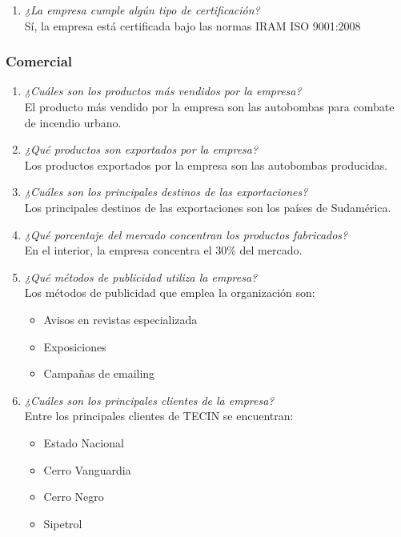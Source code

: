 \documentclass[a4paper,10pt]{article}
\begin{document}
\begin{enumerate}
				\item \textit{¿La empresa cumple algún tipo de certificación?}\\
				Sí, la empresa está certificada bajo las normas IRAM ISO 9001:2008
						
			\end{enumerate}
			
			
		\subsubsection{Comercial}
		
		
			\begin{enumerate}[resume]
			
				\item \textit{¿Cuáles son los productos más vendidos por la empresa?}\\
				El producto más vendido por la empresa son las autobombas para combate de incendio urbano.
				
				\item \textit{¿Qué productos son exportados por la empresa?}\\
				Los productos exportados por la empresa son las autobombas producidas.
				
				\item \textit{¿Cuáles son los principales destinos de las exportaciones?}\\
				Los principales destinos de las exportaciones son los países de Sudamérica.
				
				\item \textit{¿Qué porcentaje del mercado concentran los productos fabricados?}\\
				En el interior, la empresa concentra el 30\% del mercado.
				
				\item \textit{¿Qué métodos de publicidad utiliza la empresa?}\\
				Los métodos de publicidad que emplea la organización son:
				\begin{itemize}
					\item Avisos en revistas especializada
					\item Exposiciones
					\item Campañas de emailing
				\end{itemize}
				
				\item \textit{¿Cuáles son los principales clientes de la empresa?}\\
				Entre los principales clientes de TECIN se encuentran:
				\begin{itemize}
					\item Estado Nacional
					\item Cerro Vanguardia
					\item Cerro Negro
					\item Sipetrol
				\end{itemize}
				

\end{enumerate}
\end{document}

